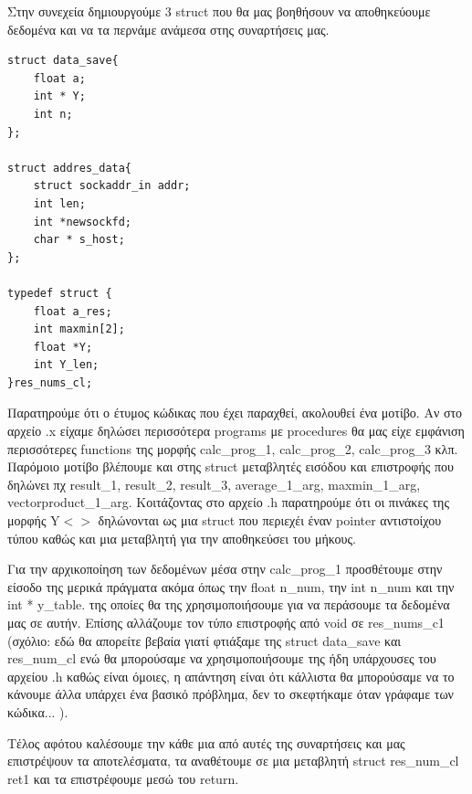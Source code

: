 \noindent
Στην συνεχεία δημιουργούμε 3 struct που θα μας βοηθήσουν να αποθηκεύουμε δεδομένα και να τα περνάμε ανάμεσα στης
συναρτήσεις μας.
\begin{center}
	\begin{lstlisting}	
struct data_save{
	float a;
	int * Y;
	int n;	
};

struct addres_data{
	struct sockaddr_in addr;
	int len;
	int *newsockfd;
	char * s_host;	
};

typedef struct {
	float a_res;
	int maxmin[2];	
	float *Y;
	int Y_len;
}res_nums_cl;
	\end{lstlisting}	
\end{center}

\noindent
Παρατηρούμε ότι ο έτυμος κώδικας που έχει παραχθεί, ακολουθεί ένα μοτίβο. Αν στο 
αρχείο .x είχαμε δηλώσει περισσότερα programs με procedures θα μας είχε εμφάνιση περισσότερες functions της μορφής
calc\_prog\_1, calc\_prog\_2, calc\_prog\_3 κλπ. Παρόμοιο μοτίβο βλέπουμε και στης struct μεταβλητές εισόδου και
επιστροφής που δηλώνει πχ result\_1, result\_2, result\_3, average\_1\_arg, maxmin\_1\_arg, vectorproduct\_1\_arg. 
Κοιτάζοντας στο αρχείο .h παρατηρούμε ότι οι πινάκες της μορφής Y\(<>\) δηλώνονται ως μια struct που περιεχέι 
έναν pointer αντιστοίχου τύπου καθώς και μια μεταβλητή για την αποθηκεύσει του μήκους. 

\noindent
Για την αρχικοποίηση των δεδομένων μέσα στην calc\_prog\_1 προσθέτουμε στην είσοδο της μερικά πράγματα ακόμα 
όπως την float n\_num, την int n\_num και την int * y\_table. της οποίες θα της χρησιμοποιήσουμε για να περάσουμε 
τα δεδομένα μας σε αυτήν. Επίσης αλλάζουμε τον τύπο επιστροφής από void σε res\_nums\_c1 (σχόλιο: εδώ θα απορείτε
βεβαία γιατί φτιάξαμε της struct data\_save και res\_num\_cl ενώ θα μπορούσαμε να χρησιμοποιήσουμε της ήδη
υπάρχουσες του αρχείου .h καθώς είναι όμοιες, η απάντηση είναι ότι κάλλιστα θα μπορούσαμε να το κάνουμε άλλα
υπάρχει ένα βασικό πρόβλημα, δεν το σκεφτήκαμε όταν γράφαμε των κώδικα... ).

\noindent
Τέλος αφότου καλέσουμε την κάθε μια από αυτές της συναρτήσεις και μας επιστρέψουν τα αποτελέσματα, τα αναθέτουμε
σε μια μεταβλητή struct res\_num\_cl ret1 και τα επιστρέφουμε μεσώ του return.

